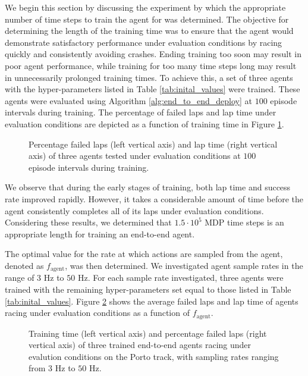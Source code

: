 We begin this section by discussing the experiment by which the appropriate number of time steps to train the agent for was determined.
The objective for determining the length of the training time was to ensure that the agent would demonstrate satisfactory performance under evaluation conditions by racing quickly and consistently avoiding crashes. 
Ending training too soon may result in poor agent performance, while training for too many time steps long may result in unnecessarily prolonged training times. 
To achieve this, a set of three agents with the hyper-parameters listed in Table \ref{tab:inital_values} were trained.
These agents were evaluated using Algorithm \ref{alg:end_to_end_deploy} at $100$ episode intervals during training.
The percentage of failed laps and lap time under evaluation conditions are depicted as a function of training time in Figure \ref{fig:MDP_steps}. 

\begin{figure}[htb!]
    \centering
    
    \caption[Percentage failed laps and lap time of an end-to-end agent during training]{Percentage failed laps (left vertical axis) and lap time (right vertical axis) of three agents tested under evaluation conditions at $100$ episode intervals during training.}
    \label{fig:MDP_steps}
\end{figure}

We observe that during the early stages of training, both lap time and success rate improved rapidly. 
However, it takes a considerable amount of time before the agent consistently completes all of its laps under evaluation conditions. 
Considering these results, we determined that $1.5\cdot10^{5}$ MDP time steps is an appropriate length for training an end-to-end agent.



The optimal value for the rate at which actions are sampled from the agent, denoted as $f_{\text{agent}}$, was then determined.
We investigated agent sample rates in the range of $3$ Hz to $50$ Hz.
For each sample rate investigated, three agents were trained with the remaining hyper-parameters set equal to those listed in Table \ref{tab:inital_values}.
Figure \ref{fig:f_agent} shows the average failed laps and lap time of agents racing under evaluation conditions as a function of $f_{\text{agent}}$.  

\begin{figure}[htb!]
    \centering
    
    \caption[Training time and percentage failed laps under evaluation conditions of end-to-end agents with various sampling rates]{Training time (left vertical axis) and percentage failed laps (right vertical axis) of three trained end-to-end agents racing under evalution conditions on the Porto track, with sampling rates ranging from $3$ Hz to $50$ Hz.}
    \label{fig:f_agent}
\end{figure}


